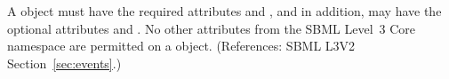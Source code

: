 A \Trigger object must have the required attributes
 and , and in addition, may have the
optional attributes   and .  No other
attributes from the SBML Level~3 Core namespace are permitted on a \Trigger
object.  (References: SBML L3V2 Section~\ref{sec:events}.)
